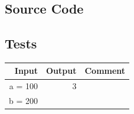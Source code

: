 \documentclass[11pt, a4paper, twoside]{article}   	%
\newcommand{\srcDir}{../src/main/java}
\newcommand{\mainPackage}{\srcDir/at/fhooe/swe4/lab3}
\newcommand{\testSection}{Tests}
\begin{document}

\subsection{Source Code}






\subsection{\testSection}

\begin{tabular}{|r|r|l|}
\hline
Input & Output & Comment \\
\hline
a = 100 & 3 & \\
b = 200 & & \\
\hline 
\end{tabular}
\end{document}

